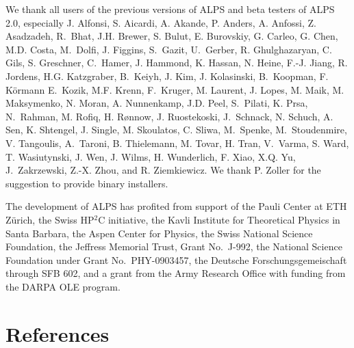 \documentclass[12pt]{iopart}
\begin{document}
We thank all users of the previous versions of ALPS and beta testers of ALPS 2.0, especially J. Alfonsi, S. Aicardi, A. Akande, P. Anders, A. Anfossi, Z. Asadzadeh, R.~Bhat, J.H. Brewer, S. Bulut, E. Burovskiy, G. Carleo, G. Chen, M.D. Costa, M.~Dolfi, J. Figgins, S.~Gazit, U.~Gerber, R. Ghulghazaryan, C. Gils, S. Greschner, C.~Hamer, J. Hammond, K. Hassan, N. Heine, F.-J. Jiang, R. Jordens, H.G. Katzgraber, B.~Keiyh, J. Kim, J. Kolasinski, B.~Koopman, F. K\"ormann E.~Kozik, M.F. Krenn, F.~Kruger, M. Laurent, J. Lopes, M. Maik, M. Maksymenko, N. Moran, A. Nunnenkamp, J.D. Peel, S.~Pilati, K. Prsa, N.~Rahman, M. Rofiq, H. R\o nnow, J. Ruostekoski, J.~Schnack, N. Schuch, A. Sen, K. Shtengel, J. Single, M. Skoulatos, C. Sliwa, M.~Spenke, M.~Stoudenmire, V. Tangoulis, A.~Taroni, B. Thielemann, M. Tovar, H. Tran, V.~Varma, S. Ward, T. Wasiutynski, J. Wen, J. Wilms, H. Wunderlich, F. Xiao, X.Q. Yu, J.~Zakrzewski, Z.-X. Zhou, and R. Ziemkiewicz. We thank P. Zoller for the suggestion to provide binary installers. 

The development of ALPS has profited from support of the Pauli Center at ETH Z\"urich, the Swiss HP$^2$C initiative, the Kavli Institute for Theoretical Physics in Santa Barbara, the Aspen Center for Physics, the Swiss National Science Foundation, the Jeffress Memorial Trust, Grant No.~J-992, the National Science Foundation under Grant No.~PHY-0903457, the Deutsche Forschungsgemeischaft through SFB 602, and a grant from the Army Research Office with funding from the DARPA OLE program.


\section*{References}



\end{document}
